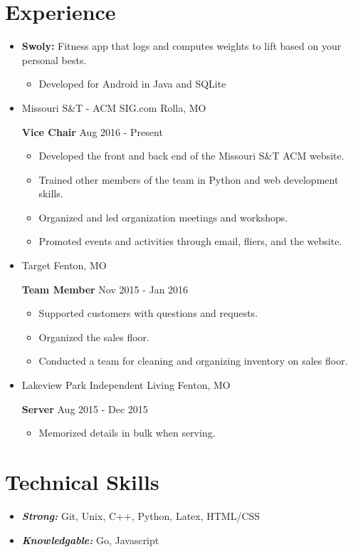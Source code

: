 \documentclass[11pt,oneside]{article}
\begin{document}
\section*{Experience}
\begin{itemize}
	\item[] \textbf{Swoly:} Fitness app that logs and computes weights to lift based on your personal bests.
			\begin{itemize}
				\item[\textbullet] Developed for Android in Java and SQLite
			\end{itemize}
\end{itemize}
\begin{itemize}
	\item[] Missouri S\&T - ACM SIG.com
			\hfill
			Rolla, MO
			
			\textbf{Vice Chair}
			\hfill
			Aug 2016 - Present
			\begin{itemize}
				\item[\textbullet] Developed the front and back end of the Missouri S\&T ACM website.
				\item[\textbullet] Trained other members of the team in Python and web development skills.
				\item[\textbullet] Organized and led organization meetings and workshops.
				\item[\textbullet] Promoted events and activities through email, fliers, and the website.
			\end{itemize}
	\item[] Target
			\hfill
			Fenton, MO
			
			\textbf{Team Member}
			\hfill
			Nov 2015 - Jan 2016
			\begin{itemize}
				\item[\textbullet] Supported customers with questions and requests.
				\item[\textbullet] Organized the sales floor.
				\item[\textbullet] Conducted a team for cleaning and organizing inventory on sales floor.
			\end{itemize}
	\item[] Lakeview Park Independent Living
			\hfill
			Fenton, MO
			
			\textbf{Server}
			\hfill
			Aug 2015 - Dec 2015
			\begin{itemize}
				\item[\textbullet] Memorized details in bulk when serving.
			\end{itemize}
\end{itemize}
\section*{Technical Skills}
\begin{itemize}
	\item[] {\bfseries \itshape Strong:} Git, Unix, C++, Python, Latex, HTML/CSS
	\item[] {\bfseries \itshape Knowledgable:} Go, Javascript
\end{itemize}
\end{document}
